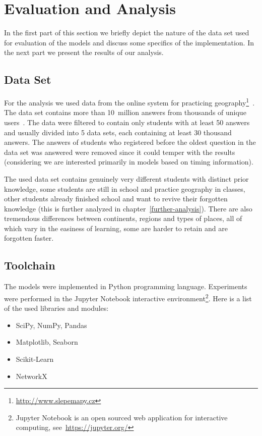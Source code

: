 \chapter{Evaluation and Analysis}

In the first part of this section we briefly depict the nature of the data set used for evaluation of the models and discuss some specifics of the implementation. In the next part we present the results of our analysis.

\section{Data Set}

For the analysis we used data from the online system for practicing geography\footnote{\url{http://www.slepemapy.cz}}~\cite{Papousek2014}. The data set contains more than 10~million answers from thousands of unique users~\cite{Papousek2015}. The data were filtered to contain only students with at least 50 answers and usually divided into 5 data sets, each containing at least 30 thousand answers. The answers of students who registered before the oldest question in the data set was answered were removed since it could temper with the results (considering we are interested primarily in models based on timing information).

The used data set contains genuinely very different students with distinct prior knowledge, some students are still in school and practice geography in classes, other students already finished school and want to revive their forgotten knowledge (this is further analyzed in chapter~\ref{further-analysis}). There are also tremendous differences between continents, regions and types of places, all of which vary in the easiness of learning, some are harder to retain and are forgotten faster.

\section{Toolchain}

The models were implemented in Python programming language. Experiments were performed in the Jupyter Notebook interactive environment\footnote{Jupyter Notebook is an open sourced web application for interactive computing, see~\url{https://jupyter.org/}}. Here is a list of the used libraries and modules:

\begin{itemize}
  \item SciPy, NumPy, Pandas
  \item Matplotlib, Seaborn
  \item Scikit-Learn
  \item NetworkX
\end{itemize}

